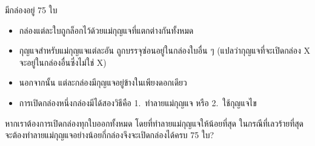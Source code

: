 \question{}

มีกล่องอยู่ 75 ใบ
\begin{itemize}
\item กล่องแต่ละใบถูกล็อกไว้ด้วยแม่กุญแจที่แตกต่างกันทั้งหมด
\item กุญแจสำหรับแม่กุญแจแต่ละอัน ถูกบรรจุซ่อนอยู่ในกล่องใบอื่น ๆ (แปลว่ากุญแจที่จะเปิดกล่อง X จะอยู่ในกล่องอื่นซึ่งไม่ใช่ X)
\item นอกจากนั้น แต่ละกล่องมีกุญแจอยู่ข้างในเพียงดอกเดียว
\item การเปิดกล่องหนึ่งกล่องมีได้สองวิธีคือ 1.~ทำลายแม่กุญแจ หรือ 2.~ใช้กุญแจไข
\end{itemize}

หากเราต้องการเปิดกล่องทุกใบออกทั้งหมด โดยที่ทำลายแม่กุญแจให้น้อยที่สุด\;
ในกรณีที่เลวร้ายที่สุดจะต้องทำลายแม่กุญแจอย่างน้อยกี่กล่องจึงจะเปิดกล่องได้ครบ 75 ใบ?
